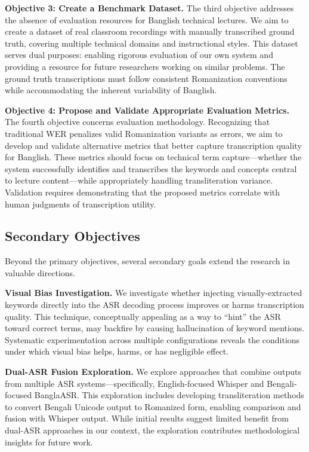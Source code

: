 \textbf{Objective 3: Create a Benchmark Dataset.} The third objective addresses the absence of evaluation resources for Banglish technical lectures. We aim to create a dataset of real classroom recordings with manually transcribed ground truth, covering multiple technical domains and instructional styles. This dataset serves dual purposes: enabling rigorous evaluation of our own system and providing a resource for future researchers working on similar problems. The ground truth transcriptions must follow consistent Romanization conventions while accommodating the inherent variability of Banglish.

\textbf{Objective 4: Propose and Validate Appropriate Evaluation Metrics.} The fourth objective concerns evaluation methodology. Recognizing that traditional WER penalizes valid Romanization variants as errors, we aim to develop and validate alternative metrics that better capture transcription quality for Banglish. These metrics should focus on technical term capture---whether the system successfully identifies and transcribes the keywords and concepts central to lecture content---while appropriately handling transliteration variance. Validation requires demonstrating that the proposed metrics correlate with human judgments of transcription utility.

\subsection{Secondary Objectives}

Beyond the primary objectives, several secondary goals extend the research in valuable directions.

\textbf{Visual Bias Investigation.} We investigate whether injecting visually-extracted keywords directly into the ASR decoding process improves or harms transcription quality. This technique, conceptually appealing as a way to ``hint'' the ASR toward correct terms, may backfire by causing hallucination of keyword mentions. Systematic experimentation across multiple configurations reveals the conditions under which visual bias helps, harms, or has negligible effect.

\textbf{Dual-ASR Fusion Exploration.} We explore approaches that combine outputs from multiple ASR systems---specifically, English-focused Whisper and Bengali-focused BanglaASR. This exploration includes developing transliteration methods to convert Bengali Unicode output to Romanized form, enabling comparison and fusion with Whisper output. While initial results suggest limited benefit from dual-ASR approaches in our context, the exploration contributes methodological insights for future work.

